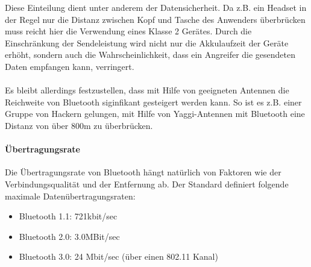             Diese Einteilung dient unter anderem der Datensicherheit. Da z.B. 
            ein Headset in der Regel nur die Distanz zwischen Kopf und Tasche
            des Anwenders überbrücken muss reicht hier die Verwendung eines Klasse 2
            Gerätes. Durch die Einschränkung der Sendeleistung wird nicht nur die
            Akkulaufzeit der Geräte erhöht, sondern auch die Wahrscheinlichkeit,
            dass ein Angreifer die gesendeten Daten empfangen kann, verringert.\\
            \\
            Es bleibt allerdings festzustellen, dass mit Hilfe von geeigneten
            Antennen die Reichweite von Bluetooth siginfikant gesteigert werden
            kann. So ist es z.B. einer Gruppe von Hackern gelungen, mit Hilfe von
            Yaggi-Antennen mit Bluetooth eine Distanz von über 800m zu überbrücken.
        \paragraph{Übertragungsrate}
            Die Übertragungsrate von Bluetooth hängt natürlich von Faktoren wie
            der Verbindungsqualität und der Entfernung ab. Der Standard definiert
            folgende maximale Datenübertragungsraten:

            \begin{itemize}
                \item{Bluetooth 1.1:} 721kbit/sec
                \item{Bluetooth 2.0:} 3.0MBit/sec
                \item{Bluetooth 3.0:} 24 Mbit/sec (über einen 802.11 Kanal)
            \end{itemize}

